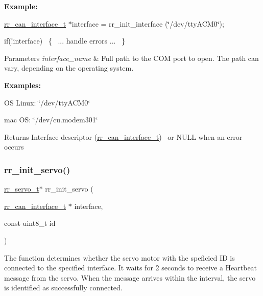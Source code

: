{\bfseries Example\+:}

\hyperlink{structrr__can__interface__t}{rr\+\_\+can\+\_\+interface\+\_\+t} $\ast$interface = rr\+\_\+init\+\_\+interface (\char`\"{}/dev/tty\+A\+C\+M0\char`\"{});

{\ttfamily if(!interface)~\newline
 \{~\newline
 ... handle errors ...~\newline
 \}}


\begin{DoxyParams}{Parameters}
{\em interface\+\_\+name} & Full path to the C\+OM port to open. The path can vary, depending on the operating system. \\
\hline
\end{DoxyParams}
{\bfseries Examples\+:}

OS Linux\+: \char`\"{}/dev/tty\+A\+C\+M0\char`\"{}

mac OS\+: \char`\"{}/dev/cu.\+modem301\char`\"{}

\begin{DoxyReturn}{Returns}
Interface descriptor (\hyperlink{structrr__can__interface__t}{rr\+\_\+can\+\_\+interface\+\_\+t})~\newline
 or N\+U\+LL when an error occurs 
\end{DoxyReturn}
\mbox{\label{group___init_ga0adb313a3eeb8a4399431e940a1f3e9e}} 
\subsubsection{\texorpdfstring{rr\+\_\+init\+\_\+servo()}{rr\_init\_servo()}}
{\footnotesize\ttfamily \hyperlink{structrr__servo__t}{rr\+\_\+servo\+\_\+t}$\ast$ rr\+\_\+init\+\_\+servo (\begin{DoxyParamCaption}\item[{\hyperlink{structrr__can__interface__t}{rr\+\_\+can\+\_\+interface\+\_\+t} $\ast$}]{interface,  }\item[{const uint8\+\_\+t}]{id }\end{DoxyParamCaption})}



The function determines whether the servo motor with the speficied ID is connected to the specified interface. It waits for 2 seconds to receive a Heartbeat message from the servo. When the message arrives within the interval, the servo is identified as successfully connected.~\newline
 

